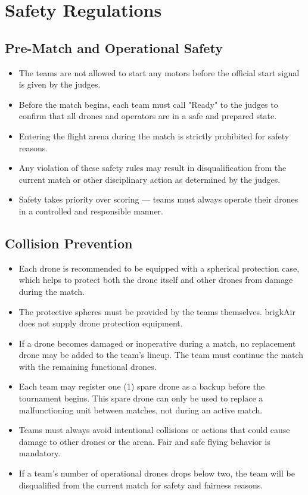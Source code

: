 
\section{Safety Regulations}

\subsection{Pre-Match and Operational Safety}
\begin{itemize}
	\item{The teams are not allowed to start any motors before the official start signal is given by the judges.}
	\item{Before the match begins, each team must call "Ready" to the judges to confirm that all drones and operators are in a safe and prepared state.}
	\item{Entering the flight arena during the match is strictly prohibited for safety reasons.}
	\item{Any violation of these safety rules may result in disqualification from the current match or other disciplinary action as determined by the judges.}
	\item{Safety takes priority over scoring — teams must always operate their drones in a controlled and responsible manner.}
\end{itemize}

\subsection{Collision Prevention}
\begin{itemize}
	\item{Each drone is recommended to be equipped with a spherical protection case, which helps to protect both the drone itself and other drones from damage during the match.}
	\item{The protective spheres must be provided by the teams themselves. brigkAir does not supply drone protection equipment.}
	\item{If a drone becomes damaged or inoperative during a match, no replacement drone may be added to the team's lineup. The team must continue the match with the remaining functional drones.}
	\item{Each team may register one (1) spare drone as a backup before the tournament begins. This spare drone can only be used to replace a malfunctioning unit between matches, not during an active match.}
	\item{Teams must always avoid intentional collisions or actions that could cause damage to other drones or the arena. Fair and safe flying behavior is mandatory.}
	\item{If a team's number of operational drones drops below two, the team will be disqualified from the current match for safety and fairness reasons.}
\end{itemize}

